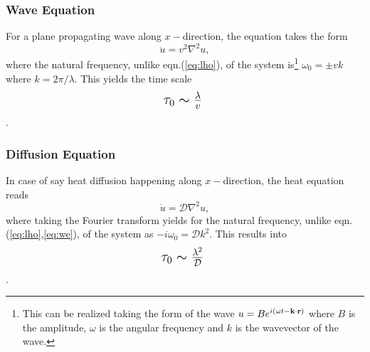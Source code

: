\documentclass[onecolumn,12pt]{article}
\begin{document}
\subsubsection{Wave Equation}
For a plane propagating wave along $x-$direction, the equation takes the form
\begin{equation}
\label{eq:we}
\boxed{\ddot{u} = v^2 \nabla^2 u}, 
\end{equation}
where the natural frequency, unlike eqn.(\ref{eq:lho}), of the system is\footnote{This can be realized taking the form of the wave $u = Be^{i(\omega t-{\bf k}\cdot {\bf r})}$ where $B$ is the amplitude, $\omega$ is the angular frequency and $k$ is the wavevector of the wave.} $\omega_0 = \pm vk$ where $k = 2\pi/\lambda$. This yields the time scale $$ \mbox{\Large $\tau_0 \sim {\lambda \over v}$ }$$. 

\subsubsection{Diffusion Equation}
In case of say heat diffusion happening along $x-$direction, the heat equation reads
\begin{equation}
\label{eq:de}
\boxed{\dot{u} = \mathcal{D} \nabla^2 u}, 
\end{equation}
where taking the Fourier transform yields for the natural frequency, unlike eqn.(\ref{eq:lho},\ref{eq:we}), of the system as $-i\omega_0 = \mathcal{D} k^2$. This results into $$ \mbox{\Large $\tau_0 \sim {\lambda^2 \over \mathcal{D}}$ }$$.
\end{document}
